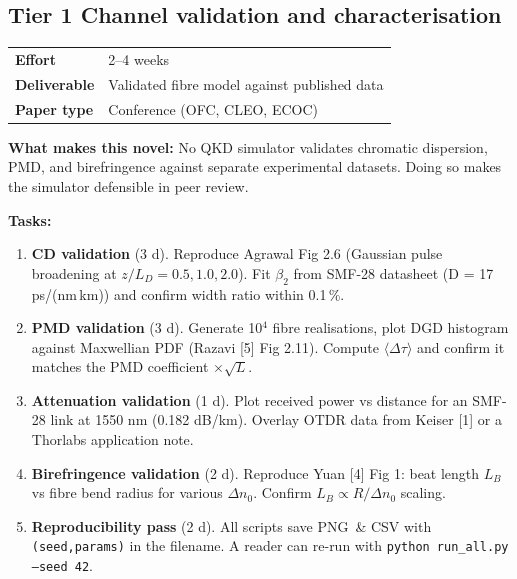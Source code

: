 \documentclass[11pt,a4paper]{article}
\begin{document}
\subsection*{\color{tier1}Tier 1 \hfill Channel validation and characterisation}

\begin{tabular}{ll}
\toprule
\textbf{Effort} & 2--4 weeks \\
\textbf{Deliverable} & Validated fibre model against published data \\
\textbf{Paper type} & Conference (OFC, CLEO, ECOC) \\
\bottomrule
\end{tabular}

\vspace{4pt}
\noindent\textbf{What makes this novel:} No QKD simulator validates chromatic dispersion, PMD, and
birefringence against separate experimental datasets.  Doing so makes the simulator defensible
in peer review.

\vspace{4pt}
\noindent\textbf{Tasks:}

\begin{enumerate}[nosep]
    \item \textbf{CD validation} (3 d).  Reproduce Agrawal Fig 2.6 (Gaussian pulse broadening at $z/L_D = 0.5, 1.0, 2.0$).
          Fit $\beta_2$ from SMF-28 datasheet (D = 17 ps/(nm\,km)) and confirm width ratio within 0.1\,\%.

    \item \textbf{PMD validation} (3 d).  Generate 10$^4$ fibre realisations, plot DGD histogram against
          Maxwellian PDF (Razavi [5] Fig 2.11).  Compute $\langle \Delta\tau \rangle$ and confirm it matches
          the PMD coefficient $\times \sqrt{L}$.

    \item \textbf{Attenuation validation} (1 d).  Plot received power vs distance for an SMF-28 link
          at 1550 nm (0.182 dB/km).  Overlay OTDR data from Keiser [1] or a Thorlabs application note.

    \item \textbf{Birefringence validation} (2 d).  Reproduce Yuan [4] Fig 1: beat length $L_B$ vs fibre
          bend radius for various $\Delta n_0$.  Confirm $L_B \propto R / \Delta n_0$ scaling.

    \item \textbf{Reproducibility pass} (2 d).  All scripts save PNG~\& CSV with \texttt{(seed,params)} in the
          filename.  A reader can re-run with \texttt{python run\_all.py --seed 42}.
\end{enumerate}
\end{document}
